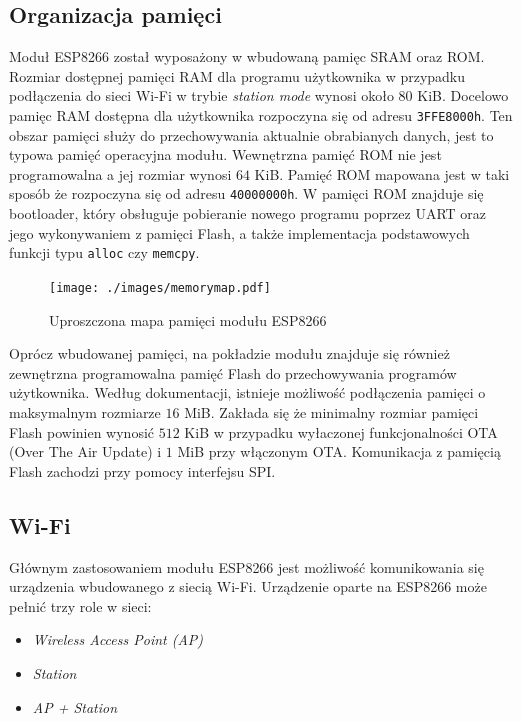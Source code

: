 \subsection{Organizacja pamięci}
\label{pamiec}
Moduł ESP8266 został wyposażony w wbudowaną pamięc SRAM oraz ROM. Rozmiar dostępnej
pamięci RAM dla programu użytkownika w przypadku podłączenia do sieci Wi-Fi w trybie
\textit{station mode} wynosi około $\num{80}$ KiB. Docelowo 
pamięc RAM dostępna dla użytkownika rozpoczyna się od adresu \texttt{3FFE8000h}.
Ten obszar pamięci służy do przechowywania aktualnie obrabianych danych, jest to typowa 
pamięć operacyjna modułu.
Wewnętrzna pamięć ROM nie jest programowalna a jej rozmiar wynosi $\num{64}$ KiB.
Pamięć ROM mapowana jest w taki sposób że rozpoczyna się od adresu \texttt{40000000h}.
W pamięci ROM znajduje się bootloader, który obsługuje pobieranie nowego programu poprzez
UART oraz jego wykonywaniem z pamięci Flash, a także implementacja podstawowych funkcji typu
\texttt{alloc} czy \texttt{memcpy}.

\begin{figure}[H]
    \texttt{[image: ./images/memorymap.pdf]}
    \caption{Uproszczona mapa pamięci modułu ESP8266}
	\label{memmap}
\end{figure}

Oprócz wbudowanej pamięci, na pokładzie modułu znajduje się również zewnętrzna programowalna
pamięć Flash do przechowywania programów użytkownika. Według dokumentacji, istnieje
możliwość podłączenia pamięci o maksymalnym rozmiarze $\num{16}$ MiB. Zakłada się 
że minimalny rozmiar pamięci Flash powinien wynosić $\num{512}$ KiB w przypadku wyłaczonej
funkcjonalności OTA (Over The Air Update) i $\num{1}$ MiB przy włączonym OTA. Komunikacja
z pamięcią Flash zachodzi przy pomocy interfejsu SPI.

\subsection{Wi-Fi}
\label{wifi}
Głównym zastosowaniem modułu ESP8266 jest możliwość komunikowania się urządzenia wbudowanego
z siecią Wi-Fi. Urządzenie oparte na ESP8266 może pełnić trzy role w sieci:\\
\begin{itemize}
    \item \textit{Wireless Access Point (AP)}
    \item \textit{Station}
    \item \textit{AP + Station}\\
\end{itemize}

